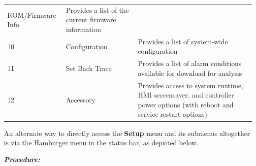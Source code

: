 \begin{longtable}[]{@{}lll@{}}
\begin{minipage}[t]{0.23\columnwidth}
ROM/Firmware Info\strut
\end{minipage} & \begin{minipage}[t]{0.65\columnwidth}\raggedright
Provides a list of the current firmware information\strut
\end{minipage}\tabularnewline
\begin{minipage}[t]{0.04\columnwidth}\raggedright
10\strut
\end{minipage} & \begin{minipage}[t]{0.23\columnwidth}\raggedright
Configuration\strut
\end{minipage} & \begin{minipage}[t]{0.65\columnwidth}\raggedright
Provides a list of system-wide configuration\strut
\end{minipage}\tabularnewline
\begin{minipage}[t]{0.04\columnwidth}\raggedright
11\strut
\end{minipage} & \begin{minipage}[t]{0.23\columnwidth}\raggedright
Set Back Trace\strut
\end{minipage} & \begin{minipage}[t]{0.65\columnwidth}\raggedright
Provides a list of alarm conditions available for download for
analysis\strut
\end{minipage}\tabularnewline
\begin{minipage}[t]{0.04\columnwidth}\raggedright
12\strut
\end{minipage} & \begin{minipage}[t]{0.23\columnwidth}\raggedright
Accessory\strut
\end{minipage} & \begin{minipage}[t]{0.65\columnwidth}\raggedright
Provides access to system runtime, HMI screensaver, and controller power
options (with reboot and service restart options)\strut
\end{minipage}\tabularnewline
\bottomrule
\end{longtable}

An alternate way to directly access the \textbf{Setup} menu and its
submenus altogether is via the Hamburger menu in the status bar, as
depicted below.

\textbf{\emph{Procedure:}}

